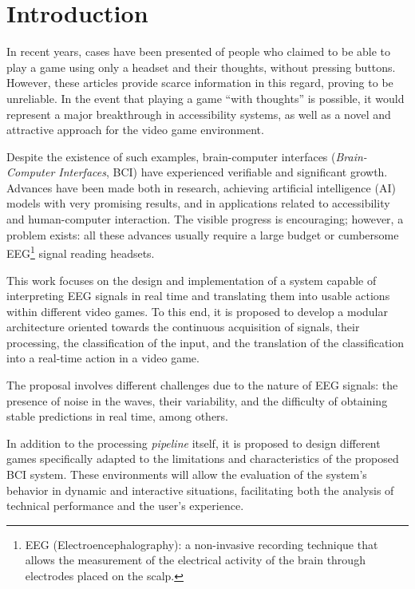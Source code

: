 \chapter*{Introduction}
\label{cap:introduction}

In recent years, cases have been presented of people who claimed to be able to
play a game using only a headset and their thoughts, without pressing buttons.
However, these articles provide scarce information in this regard, proving to
be unreliable. In the event that playing a game ``with thoughts'' is possible,
it would represent a major breakthrough in accessibility systems, as well as a
novel and attractive approach for the video game environment.

Despite the existence of such examples, brain-computer interfaces
(\textit{Brain-Computer Interfaces}, BCI) have experienced verifiable and
significant growth. Advances have been made both in research, achieving
artificial intelligence (AI) models with very promising results, and in
applications related to accessibility and human-computer interaction. The
visible progress is encouraging; however, a problem exists: all these advances
usually require a large budget or cumbersome EEG\footnote{EEG
(Electroencephalography): a non-invasive recording technique that allows the
measurement of the electrical activity of the brain through electrodes placed on
the scalp.} signal reading headsets.

This work focuses on the design and implementation of a system capable of
interpreting EEG signals in real time and translating them into usable actions
within different video games. To this end, it is proposed to develop a modular
architecture oriented towards the continuous acquisition of signals, their
processing, the classification of the input, and the translation of the
classification into a real-time action in a video game.

The proposal involves different challenges due to the nature of EEG signals:
the presence of noise in the waves, their variability, and the difficulty of
obtaining stable predictions in real time, among others.

In addition to the processing \textit{pipeline} itself, it is proposed to
design different games specifically adapted to the limitations and
characteristics of the proposed BCI system. These environments will allow the
evaluation of the system's behavior in dynamic and interactive situations,
facilitating both the analysis of technical performance and the user's
experience.

